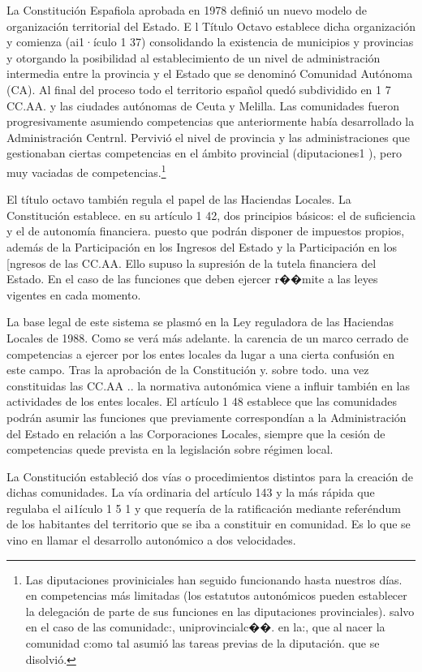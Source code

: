 \documentclass[10pt,a4paper]{article}
\begin{document}
La Constitución Espafiola aprobada en 1978 definió un nuevo modelo de organización territorial del Estado. E l Título Octavo establece dicha organización y comienza (ai1·ículo 1 37) consolidando la existencia de municipios y provincias y otorgando la posibilidad al establecimiento de un nivel de administración intermedia entre la provincia y el Estado que se denominó Comunidad Autónoma (CA). Al final del proceso todo el territorio español quedó subdividido en 1 7 CC.AA. y las ciudades autónomas de Ceuta y Melilla. Las comunidades fueron progresivamente asumiendo competencias que anteriormente había desarrollado la Administración Centrnl. Pervivió el nivel de provincia y las administraciones que gestionaban ciertas competencias en el ámbito provincial (diputaciones1 ), pero muy vaciadas de competencias.\footnote{
Las diputaciones proviniciales han seguido funcionando hasta nuestros días. en competencias más limitadas (los estatutos autonómicos pueden establecer la delegación de parte de sus funciones en las diputaciones provinciales). salvo en el caso de las comunidadc:, uniprovincialc��. en la:, que al nacer la comunidad c:omo tal asumió las tareas previas de la diputación. que se disolvió.
}

El título octavo también regula el papel de las Haciendas Locales. La Constitución establece. en su artículo 1 42, dos principios básicos: el de suficiencia y el de autonomía financiera. puesto que podrán disponer de impuestos propios, además de la Participación en los Ingresos del Estado y la Participación en los [ngresos de las CC.AA. Ello supuso la supresión de la tutela financiera del Estado. En el caso de las funciones que deben ejercer r��mite a las leyes vigentes en cada momento. 

La base legal de este sistema se plasmó en la Ley reguladora de las Haciendas Locales de 1988. Como se verá más adelante. la carencia de un marco cerrado de competencias a ejercer por los entes locales da lugar a una cierta confusión en este campo. Tras la aprobación de la Constitución y. sobre todo. una vez constituidas las CC.AA .. la normativa autonómica viene a influir también en las actividades de los entes locales. El artículo 1 48 establece que las comunidades podrán asumir las funciones que previamente correspondían a la Administración del Estado en relación a las Corporaciones Locales, siempre que la cesión de competencias quede prevista en la legislación sobre régimen local.

La Constitución estableció dos vías o procedimientos distintos para la creación de dichas comunidades. La vía ordinaria del artículo 143 y la más rápida que regulaba el ai1ículo 1 5 1 y que requería de la ratificación mediante referéndum de los habitantes del territorio que se iba a constituir en comunidad. Es lo que se vino en llamar el desarrollo autonómico a dos velocidades.
\end{document}
